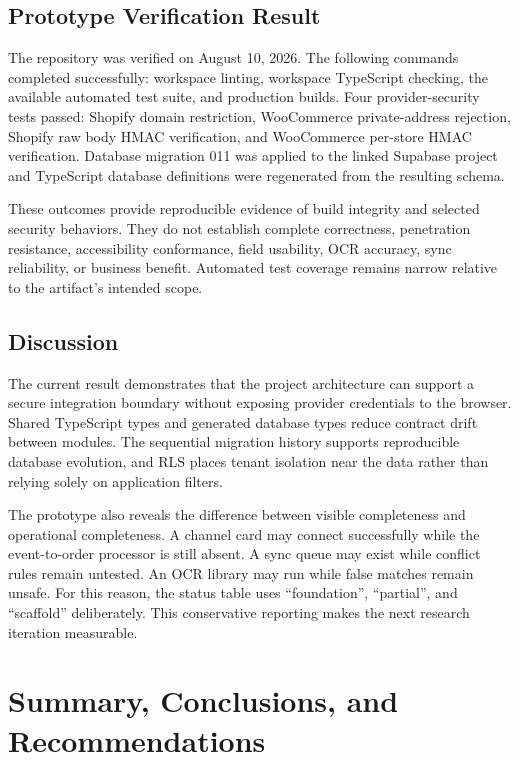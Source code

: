 \documentclass[12pt,oneside]{report}
\begin{document}
\section{Prototype Verification Result}
The repository was verified on August 10, 2026. The following commands completed
successfully: workspace linting, workspace TypeScript checking, the available
automated test suite, and production builds. Four provider-security tests passed:
Shopify domain restriction, WooCommerce private-address rejection, Shopify raw
body HMAC verification, and WooCommerce per-store HMAC verification. Database
migration 011 was applied to the linked Supabase project and TypeScript database
definitions were regenerated from the resulting schema.

These outcomes provide reproducible evidence of build integrity and selected
security behaviors. They do not establish complete correctness, penetration
resistance, accessibility conformance, field usability, OCR accuracy, sync
reliability, or business benefit. Automated test coverage remains narrow
relative to the artifact's intended scope.

\section{Discussion}
The current result demonstrates that the project architecture can support a
secure integration boundary without exposing provider credentials to the
browser. Shared TypeScript types and generated database types reduce contract
drift between modules. The sequential migration history supports reproducible
database evolution, and RLS places tenant isolation near the data rather than
relying solely on application filters.

The prototype also reveals the difference between visible completeness and
operational completeness. A channel card may connect successfully while the
event-to-order processor is still absent. A sync queue may exist while conflict
rules remain untested. An OCR library may run while false matches remain unsafe.
For this reason, the status table uses \enquote{foundation}, \enquote{partial},
and \enquote{scaffold} deliberately. This conservative reporting makes the next
research iteration measurable.

\chapter{Summary, Conclusions, and Recommendations}
\end{document}
